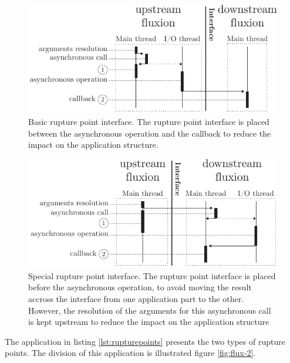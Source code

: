 \begin{figure}[h!]
\begin{center}
  \includegraphics[width=\linewidth]{ressources/basicrp.pdf}
  \caption{Basic rupture point interface. \textnormal{The rupture point interface is placed between the asynchronous operation and the callback to reduce the impact on the application structure.}}
  \label{fig:basicrp}
\end{center}
\end{figure}

\begin{figure}[h!]
\begin{center}
  \includegraphics[width=\linewidth]{ressources/specialrp.pdf}
  \caption{Special rupture point interface. \textnormal{The rupture point interface is placed before the asynchronous operation, to avoid moving the result accross the interface from one application part to the other. However, the resolution of the arguments for this asynchronous call is kept upstream to reduce the impact on the application structure}}
  \label{fig:specialrp}
\end{center}
\end{figure}

The application in listing \ref{lst:rupturepoints} presents the two types of rupture points.
The division of this application is illustrated figure \ref{fig:flux-2}.

